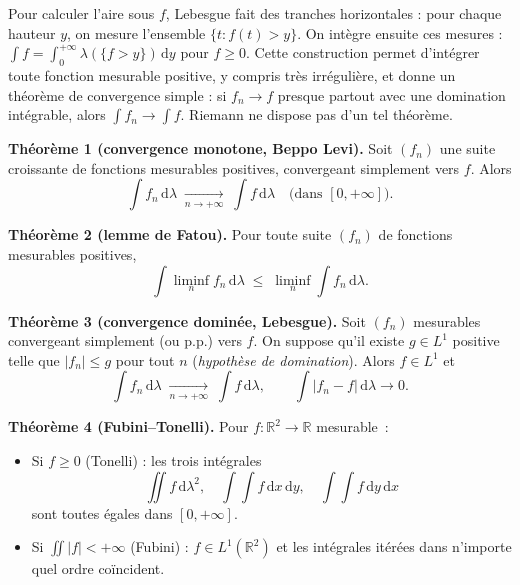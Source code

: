 \begin{significationintuitive}
Pour calculer l'aire sous $f$, Lebesgue fait des tranches horizontales :
pour chaque hauteur $y$, on mesure l'ensemble $\{t : f(t) > y\}$. On
intègre ensuite ces mesures :
$\int f = \int_0^{+\infty} \lambda(\{f > y\})\,\mathrm{d}y$ pour $f \geq 0$.
Cette construction permet d'intégrer toute fonction mesurable positive,
y compris très irrégulière, et donne un théorème de convergence simple :
si $f_n \to f$ presque partout avec une domination intégrable, alors
$\int f_n \to \int f$. Riemann ne dispose pas d'un tel théorème.
\end{significationintuitive}

\decsep{}


\begin{tcolorbox}[thmbox]
  \textbf{Théorème 1 (convergence monotone, Beppo Levi).}\enspace%
  Soit $(f_n)$ une suite croissante de fonctions mesurables positives,
  convergeant simplement vers $f$. Alors
  \[
    \int f_n\,\mathrm{d}\lambda \;\xrightarrow[n\to+\infty]{}\;
    \int f\,\mathrm{d}\lambda \quad \text{(dans }[0,+\infty]\text{)}.
  \]

  \medskip
  \textbf{Théorème 2 (lemme de Fatou).}\enspace{}
  Pour toute suite $(f_n)$ de fonctions mesurables positives,
  \[
    \int \liminf_n f_n\,\mathrm{d}\lambda
    \;\leq\; \liminf_n \int f_n\,\mathrm{d}\lambda.
  \]

  \medskip
  \textbf{Théorème 3 (convergence dominée, Lebesgue).}\enspace%
  Soit $(f_n)$ mesurables convergeant simplement (ou p.p.) vers $f$.
  On suppose qu'il existe $g \in L^1$ positive telle que $|f_n| \leq g$
  pour tout $n$ (\emph{hypothèse de domination}). Alors $f \in L^1$ et
  \[
    \int f_n\,\mathrm{d}\lambda \;\xrightarrow[n\to+\infty]{}\;
    \int f\,\mathrm{d}\lambda,
    \qquad
    \int |f_n - f|\,\mathrm{d}\lambda \to 0.
  \]

  \medskip
  \textbf{Théorème 4 (Fubini--Tonelli).}\enspace%
  Pour $f : \mathbb{R}^2 \to \mathbb{R}$ mesurable~:
  \begin{itemize}
    \item Si $f \geq 0$ (Tonelli) : les trois intégrales
    \[
      \iint f\,\mathrm{d}\lambda^2,\quad
      \int\!\!\!\int f\,\mathrm{d}x\,\mathrm{d}y,\quad
      \int\!\!\!\int f\,\mathrm{d}y\,\mathrm{d}x
    \]
    sont toutes égales dans $[0,+\infty]$.
    \item Si $\iint |f| < +\infty$ (Fubini) : $f \in L^1(\mathbb{R}^2)$ et
    les intégrales itérées dans n'importe quel ordre coïncident.
  \end{itemize}
\end{tcolorbox}

